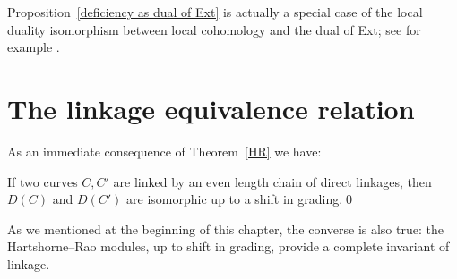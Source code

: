 Proposition~\ref{deficiency as dual of Ext} is actually a special case
of the local duality isomorphism between local cohomology and the dual
of Ext; see for example \cite[Theorem A.1.9]{MR2103875}.

\section{The linkage equivalence relation}
As an immediate consequence of Theorem~\ref{HR} we have:

\begin{corollary}[Hartshorne]
If two curves $C,C'$ are linked by an even length chain of direct
linkages, then
$D(C)$ and $D(C')$ are isomorphic up to a shift in grading.\qed
\unif
\end{corollary}

As we mentioned at the beginning of this chapter, the converse is also
true: the
Hartshorne--Rao modules,
%
up to shift in grading, provide a
%
complete invariant of linkage. 

